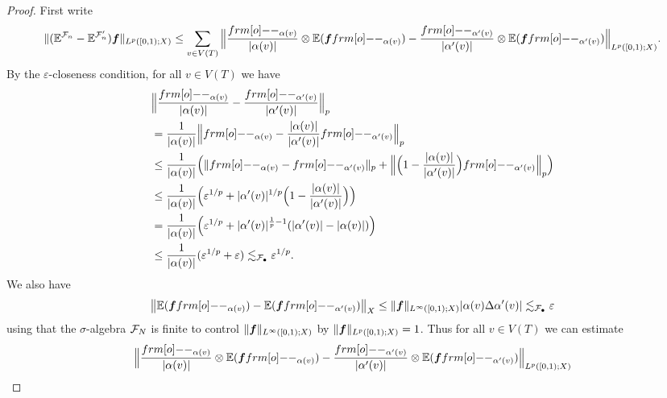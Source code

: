 \begin{proof}
  First write
  \begin{equation*}
    \|(\E^{\mc{F}_{n}} - \E^{\mc{F}_{n}'})\mb{f}\|_{L^p([0,1);X)} \leq \sum_{v \in V(T)} \Big\| \frac{\1_{\alpha(v)}}{|\alpha(v)|} \otimes \E(\mb{f}\1_{\alpha(v)}) - \frac{\1_{\alpha'(v)}}{|\alpha'(v)|} \otimes \E(\mb{f}\1_{\alpha'(v)}) \Big\|_{L^p([0,1);X)}.
  \end{equation*}
  By the $\varepsilon$-closeness condition, for all $v \in V(T)$ we have
  \begin{equation*}
    \begin{aligned}
      &\Big\| \frac{\1_{\alpha(v)}}{|\alpha(v)|} - \frac{\1_{\alpha'(v)}}{|\alpha'(v)|} \Big\|_{p} \\
      &= \frac{1}{|\alpha(v)|} \Big\| \1_{\alpha(v)} - \frac{|\alpha(v)|}{|\alpha'(v)|} \1_{\alpha'(v)} \Big\|_{p} \\
      &\leq \frac{1}{|\alpha(v)|} \Big( \| \1_{\alpha(v)} - \1_{\alpha'(v)} \|_{p} + \Big\| \Big( 1 - \frac{|\alpha(v)|}{|\alpha'(v)|} \Big) \1_{\alpha'(v)} \Big\|_{p} \Big) \\
      &\leq \frac{1}{|\alpha(v)|} \Big( \varepsilon^{1/p} + |\alpha'(v)|^{1/p}\Big(1 - \frac{|\alpha(v)|}{|\alpha'(v)|} \Big) \Big) \\
      &= \frac{1}{|\alpha(v)|} \Big( \varepsilon^{1/p} + |\alpha'(v)|^{\frac{1}{p} - 1} (|\alpha'(v)| - |\alpha(v)| ) \Big) \\
      &\leq \frac{1}{|\alpha(v)|} (\varepsilon^{1/p} + \varepsilon) 
      \lesssim_{\mc{F}_{\bullet}} \varepsilon^{1/p}.
  \end{aligned}
\end{equation*}
We also have
\begin{equation*}
  \begin{aligned}
    \big\| \E(\mb{f}\1_{\alpha(v)}) - \E(\mb{f}\1_{\alpha'(v)}) \big\|_{X}
    \leq \|\mb{f}\|_{L^\infty([0,1);X)} |\alpha(v) \Delta \alpha'(v)| \lesssim_{\mc{F}_{\bullet}} \varepsilon
  \end{aligned}
\end{equation*}
using that the $\sigma$-algebra $\mathcal{F}_{N}$ is finite to control $\|\bm{f}\|_{L^\infty([0,1);X)}$ by $\|\bm{f}\|_{L^p([0,1);X)} = 1$.
Thus for all $v \in V(T)$ we can estimate
\begin{equation*}
  \begin{aligned}
    &\Big\| \frac{\1_{\alpha(v)}}{|\alpha(v)|} \otimes \E(\mb{f}\1_{\alpha(v)}) - \frac{\1_{\alpha'(v)}}{|\alpha'(v)|} \otimes \E(\mb{f}\1_{\alpha'(v)}) \Big\|_{L^p([0,1);X)} \\

\end{aligned}
\end{equation*}
\end{proof}
